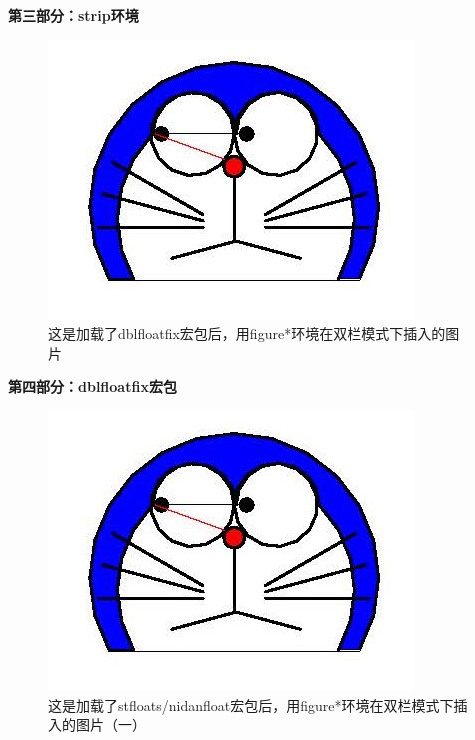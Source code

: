 ﻿\documentclass{article}
\begin{document}
    \textbf{第三部分：strip环境}

    \blindtext[2]

\twocolumn
    \begin{figure}[b] %
        \includegraphics[width = .1\textwidth]{doraemon1.jpg}
        \caption{这是加载了dblfloatfix宏包后，用figure*环境在双栏模式下插入的图片}
    \end{figure}

    \textbf{第四部分：dblfloatfix宏包}

    \blindtext[4]

\twocolumn
    \begin{figure}[bp]
        \includegraphics[width = .1\textwidth]{doraemon1.jpg}
        \caption{这是加载了stfloats/nidanfloat宏包后，用figure*环境在双栏模式下插入的图片（一）}
    \end{figure}
\end{document}
